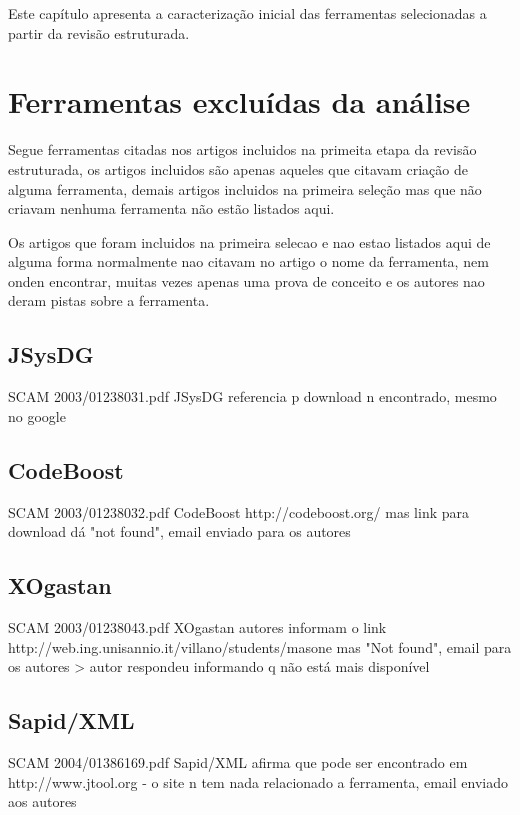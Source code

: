 {Este capítulo apresenta a caracterização inicial das ferramentas selecionadas a partir da revisão estruturada.}
\label{caracterizacao-ferramentas}

\section{Ferramentas excluídas da análise}

Segue ferramentas citadas nos artigos incluidos na primeita etapa da revisão
estruturada, os artigos incluidos são apenas aqueles que citavam criação de
alguma ferramenta, demais artigos incluidos na primeira seleção mas que não
criavam nenhuma ferramenta não estão listados aqui.

Os artigos que foram incluidos na primeira selecao e nao estao listados aqui de alguma forma
normalmente nao citavam no artigo o nome da ferramenta, nem onden encontrar, muitas vezes
apenas uma prova de conceito e os autores nao deram pistas sobre a ferramenta.

\subsection{JSysDG}

SCAM 2003/01238031.pdf JSysDG
 referencia p download n encontrado, mesmo no google

\subsection{CodeBoost}

SCAM 2003/01238032.pdf CodeBoost
 http://codeboost.org/ mas link para download dá "not found", email enviado para os autores

\subsection{XOgastan}

SCAM 2003/01238043.pdf XOgastan
 autores informam o link http://web.ing.unisannio.it/villano/students/masone mas "Not found", email para os autores
 > autor respondeu informando q não está mais disponível

\subsection{Sapid/XML}

SCAM 2004/01386169.pdf Sapid/XML
 afirma que pode ser encontrado em http://www.jtool.org - o site n tem nada relacionado a ferramenta, email enviado aos autores


